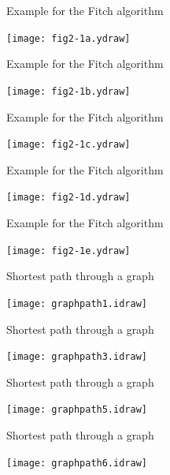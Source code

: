 \documentclass[bluish,slideColor,colorBG,pdf]{prosper}
\begin{document}
\begin{slide}[Replace]{Example for the Fitch algorithm}

\centerline{\texttt{[image: fig2-1a.ydraw]}}

\end{slide}

\begin{slide}[Replace]{Example for the Fitch algorithm}

\centerline{\texttt{[image: fig2-1b.ydraw]}}

\end{slide}

\begin{slide}[Replace]{Example for the Fitch algorithm}

\centerline{\texttt{[image: fig2-1c.ydraw]}}

\end{slide}

\begin{slide}[Replace]{Example for the Fitch algorithm}

\centerline{\texttt{[image: fig2-1d.ydraw]}}

\end{slide}

\begin{slide}[Replace]{Example for the Fitch algorithm}

\centerline{\texttt{[image: fig2-1e.ydraw]}}

\end{slide}

\begin{slide}[Replace]{Shortest path through a graph}

\centerline{\texttt{[image: graphpath1.idraw]}}

\end{slide}

\begin{slide}[Replace]{Shortest path through a graph}

\centerline{\texttt{[image: graphpath3.idraw]}}

\end{slide}

\begin{slide}[Replace]{Shortest path through a graph}

\centerline{\texttt{[image: graphpath5.idraw]}}

\end{slide}

\begin{slide}[Replace]{Shortest path through a graph}

\centerline{\texttt{[image: graphpath6.idraw]}}

\end{slide}
\end{document}
